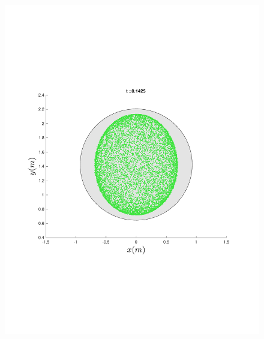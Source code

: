 \begin{figure}
{\begin{minipage}{0.5\textwidth}
\begin{minipage}[b]{0.5\textwidth}
        \includegraphics[width=\textwidth]{figures/method/FunnelSimOverlaid20funnel-1}
      \end{minipage}%
    \end{minipage} %
  }
\end{figure}
